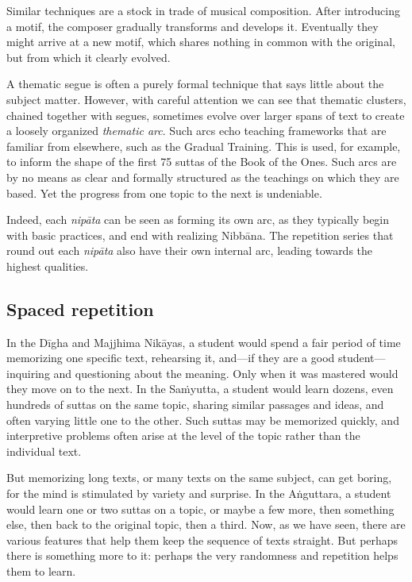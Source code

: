 \documentclass[12pt,openany]{book}%
\begin{document}
Similar techniques are a stock in trade of musical composition. After introducing a motif, the composer gradually transforms and develops it. Eventually they might arrive at a new motif, which shares nothing in common with the original, but from which it clearly evolved.

A thematic segue is often a purely formal technique that says little about the subject matter. However, with careful attention we can see that thematic clusters, chained together with segues, sometimes evolve over larger spans of text to create a loosely organized \emph{thematic arc}. Such arcs echo teaching frameworks that are familiar from elsewhere, such as the Gradual Training. This is used, for example, to inform the shape of the first 75 suttas of the Book of the Ones. Such arcs are by no means as clear and formally structured as the teachings on which they are based. Yet the progress from one topic to the next is undeniable.

Indeed, each \textit{\textsanskrit{nipāta}} can be seen as forming its own arc, as they typically begin with basic practices, and end with realizing \textsanskrit{Nibbāna}. The repetition series that round out each \textit{\textsanskrit{nipāta}} also have their own internal arc, leading towards the highest qualities.

\subsection*{Spaced repetition}

In the \textsanskrit{Dīgha} and Majjhima \textsanskrit{Nikāyas}, a student would spend a fair period of time memorizing one specific text, rehearsing it, and—if they are a good student—inquiring and questioning about the meaning. Only when it was mastered would they move on to the next. In the \textsanskrit{Saṁyutta}, a student would learn dozens, even hundreds of suttas on the same topic, sharing similar passages and ideas, and often varying little one to the other. Such suttas may be memorized quickly, and interpretive problems often arise at the level of the topic rather than the individual text.

But memorizing long texts, or many texts on the same subject, can get boring, for the mind is stimulated by variety and surprise. In the \textsanskrit{Aṅguttara}, a student would learn one or two suttas on a topic, or maybe a few more, then something else, then back to the original topic, then a third. Now, as we have seen, there are various features that help them keep the sequence of texts straight. But perhaps there is something more to it: perhaps the very randomness and repetition helps them to learn.
\end{document}
